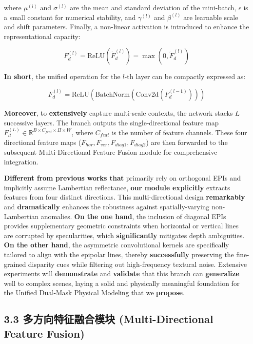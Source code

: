 \documentclass[journal]{IEEEtran}
\begin{document}
where $\mu^{(l)}$ and $\sigma^{(l)}$ are the mean and standard deviation of the mini-batch, $\epsilon$ is a small constant for numerical stability, and $\gamma^{(l)}$ and $\beta^{(l)}$ are learnable scale and shift parameters. Finally, a non-linear activation is introduced to enhance the representational capacity:

\[
F_d^{(l)} = \text{ReLU}(\tilde{F}_d^{(l)}) = \max(0, \tilde{F}_d^{(l)}) \label{eq:relu}
\]

\textbf{In short}, the unified operation for the $l$-th layer can be compactly expressed as:

\[
F_d^{(l)} = \text{ReLU}\left(\text{BatchNorm}\left(\text{Conv2d}\left(F_d^{(l-1)}\right)\right)\right) \label{eq:directional_branch}
\]

\textbf{Moreover}, to \textbf{extensively} capture multi-scale contexts, the network stacks $L$ successive layers. The branch outputs the single-directional feature map $F_d^{(L)} \in \mathbb{R}^{B \times C_{feat} \times H \times W}$, where $C_{feat}$ is the number of feature channels. These four directional feature maps ($F_{hor}, F_{ver}, F_{diag1}, F_{diag2}$) are then forwarded to the subsequent Multi-Directional Feature Fusion module for comprehensive integration.

\textbf{Different from previous works that} primarily rely on orthogonal EPIs and implicitly assume Lambertian reflectance, \textbf{our module explicitly} extracts features from four distinct directions. This multi-directional design \textbf{remarkably} and \textbf{dramatically} enhances the robustness against spatially-varying non-Lambertian anomalies. \textbf{On the one hand}, the inclusion of diagonal EPIs provides supplementary geometric constraints when horizontal or vertical lines are corrupted by specularities, which \textbf{significantly} mitigates depth ambiguities. \textbf{On the other hand}, the asymmetric convolutional kernels are specifically tailored to align with the epipolar lines, thereby \textbf{successfully} preserving the fine-grained disparity cues while filtering out high-frequency textural noise. Extensive experiments will \textbf{demonstrate} and \textbf{validate} that this branch can \textbf{generalize} well to complex scenes, laying a solid and physically meaningful foundation for the Unified Dual-Mask Physical Modeling that we \textbf{propose}.

\subsection{3.3 多方向特征融合模块 (Multi-Directional Feature Fusion)}
\end{document}
